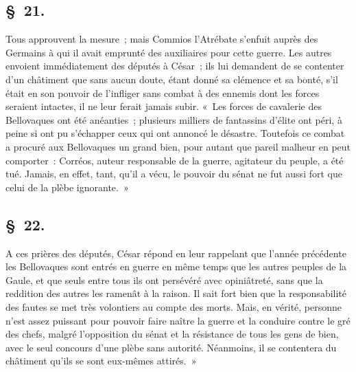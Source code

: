 \documentclass[french,twoside]{book} %
\begin{document}
\subsection[{§ 21.}]{ \textsc{§ 21.} }
\noindent Tous approuvent la mesure ; mais Commios l’Atrébate s’enfuit auprès des Germains à qui il avait emprunté des auxiliaires pour cette guerre. Les autres envoient immédiatement des députés à César ; ils lui demandent de se contenter d’un châtiment que sans aucun doute, étant donné sa clémence et sa bonté, s’il était en son pouvoir de l’infliger sans combat à des ennemis dont les forces seraient intactes, il ne leur ferait jamais subir. « Les forces de cavalerie des Bellovaques ont été anéanties ; plusieurs milliers de fantassins d’élite ont péri, à peine si ont pu s’échapper ceux qui ont annoncé le désastre. Toutefois ce combat a procuré aux Bellovaques un grand bien, pour autant que pareil malheur en peut comporter : Corréos, auteur responsable de la guerre, agitateur du peuple, a été tué. Jamais, en effet, tant, qu’il a vécu, le pouvoir du sénat ne fut aussi fort que celui de la plèbe ignorante. »
\subsection[{§ 22.}]{ \textsc{§ 22.} }
\noindent A ces prières des députés, César répond en leur rappelant que l’année précédente les Bellovaques sont entrés en guerre en même temps que les autres peuples de la Gaule, et que seuls entre tous ils ont persévéré avec opiniâtreté, sans que la reddition des autres les ramenât à la raison. Il sait fort bien que la responsabilité des fautes se met très volontiers au compte des morts. Mais, en vérité, personne n’est assez puissant pour pouvoir faire naître la guerre et la conduire contre le gré des chefs, malgré l’opposition du sénat et la résistance de tous les gens de bien, avec le seul concours d’une plèbe sans autorité. Néanmoins, il se contentera du châtiment qu’ils se sont eux-mêmes attirés. »
\end{document}
